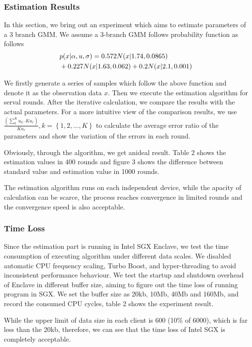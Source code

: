 \documentclass[conference]{IEEEtran}
\begin{document}
\subsubsection{Estimation Results}
In this section, we bring out an experiment which aims to estimate parameters of 
a 3 branch GMM. We assume a 3-branch GMM follows probability function as follows
\begin{align}
  &p(x|\alpha,u,\sigma) = 0.572N(x|1.74,0.0865) \notag \\
  &+0.227N(x|1.63,0.062)+0.2N(x|2.1,0.001) \notag
\end{align}

We firstly generate a series of samples which follow the above function and denote
it as the observation data $x$. Then we execute the estimation algorithm for serval rounds. 
After the iterative calculation, we compare the results with the actual parameters. 
For a more intuitive view of the comparison results, we use 
$\frac{(\sum_{k}^{K}u_k – Ku_r)}{Ku_r}, k=\left\{1,2,\dots,K \right\}$ to calculate 
the average error ratio of the parameters and show the variation of the errors in each round. 

Obviously, through the algorithm, we get anideal result. Table 2 shows the 
estimation values in 400 rounds and figure 3 shows 
the difference between standard value and estimation value in 1000 rounds. 

The estimation algorithm runs on each independent device, while the apacity of calculation can be scarce,
the process reaches convergence in limited rounds and the convergence speed is also acceptable.

\subsubsection{Time Loss}
Since the estimation part is running in Intel SGX Enclave, we test the time consumption of 
executing algorithm under different data scales. We disabled automatic CPU frequency scaling,
Turbo Boost, and hyper-threading to avoid inconsistent performance behaviour.
We test the startup and shutdown overhead of Enclave in different buffer size, 
aiming to figure out the time loss of running program in SGX. We set the 
buffer size as 20kb, 10Mb, 40Mb and 160Mb, and record the consumed CPU cycles, table 2 shows the experiment result. 

While the upper limit of data size in each client is 600 (10\% of 6000),
which is far less than the 20kb, therefore, we can see that the time loss of Intel SGX is completely acceptable.
\end{document}
